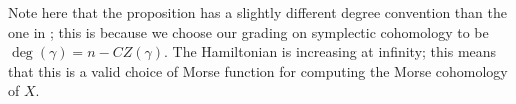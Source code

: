 
 
 \label{rem:homologyIncludesIntoSH}
Note here that the proposition has a slightly different degree convention than the one in \cite{seidel2006biased}; this is because we choose our grading on symplectic cohomology to be $\deg(\gamma)=n-CZ(\gamma)$. The Hamiltonian is increasing at infinity; this means that this is a valid choice of Morse function for computing the Morse cohomology of $X$.
 